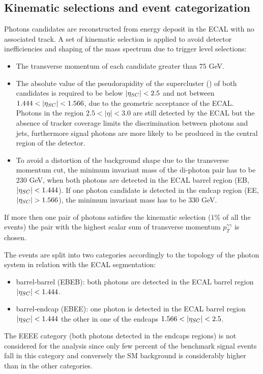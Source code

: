 \subsection{Kinematic selections and event categorization}
\label{subsec:event_cats}
Photons candidates are reconstructed from energy deposit in the ECAL with no associated track.
A set of kinematic selection is applied to avoid detector inefficiencies and shaping of the mass
spectrum due to trigger level selections:
\begin{itemize}
\item The transverse momentum of each candidate greater than $75$ GeV.
\item The absolute value of the pseudorapidity of the supercluster (\absScEta) of both
candidates is required to be below $|\eta_{SC}| < 2.5$ and not between $1.444 < |\eta_{SC}| < 1.566$,
due to the geometric acceptance of the ECAL. Photons in the region $2.5 < |\eta| < 3.0$ are still detected by the ECAL
but the absence of tracker coverage limits the discrimination between photons and jets, furthermore signal photons
are more likely to be produced in the central region of the detector.
\item To avoid a distortion of the background shape due to the transverse momentum
  cut, the minimum invariant mass of the di-photon pair has to be $230$ GeV, when
both photons are detected in the ECAL barrel region (EB, $|\eta_{SC}| < 1.444$). If one photon candidate
is detected in the endcap region (EE, $|\eta_{SC}| > 1.566$), the minimum invariant mass
has to be $330$ GeV.
\end{itemize}

If more then one pair of photons satisfies the kinematic selection ($1\%$ of all the events) the pair
with the highest scalar sum of transverse momentum $p_T^{\gamma\gamma}$ is chosen.

The events are split into two categories accordingly to the topology of the photon system in relation
with the ECAL segmentation:
\begin{itemize}
\item barrel-barrel (EBEB): both photons are detected in the ECAL barrel region $|\eta_{SC}| < 1.444$.
\item barrel-endcap (EBEE): one photon is detected in the ECAL barrel region $|\eta_{SC}| < 1.444$ the other
  in one of the endcaps $1.566 < |\eta_{SC}| < 2.5$.
\end{itemize}

The EEEE category (both photons detected in the endcaps regions) is not considered for the analysis
since only few percent of the benchmark signal events fall in this category and conversely the SM
background is considerably higher than in the other categories.

